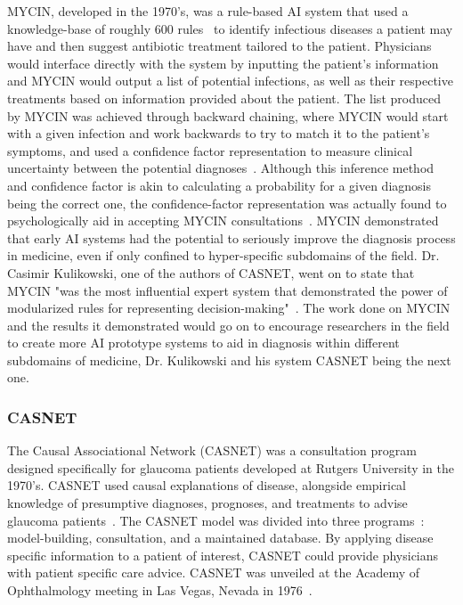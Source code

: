 \documentclass{article}
\begin{document}
MYCIN, developed in the 1970's, was a rule-based AI system that used a knowledge-base of roughly 600 rules~\cite{kaul_history_2020} to identify infectious diseases a patient may have and then suggest antibiotic treatment tailored to the patient. Physicians would interface directly with the system by inputting the patient's information and MYCIN would output a list of potential infections, as well as their respective treatments based on information provided about the patient. The list produced by MYCIN was achieved through backward chaining, where MYCIN would start with a given infection and work backwards to try to match it to the patient's symptoms, and used a confidence factor representation to measure clinical uncertainty between the potential diagnoses~\cite{kulikowski_beginnings_2019}. Although this inference method and confidence factor is akin to calculating a probability for a given diagnosis being the correct one, the confidence-factor representation was actually found to psychologically aid in accepting MYCIN consultations~\cite{kulikowski_beginnings_2019}. MYCIN demonstrated that early AI systems had the potential to seriously improve the diagnosis process in medicine, even if only confined to hyper-specific subdomains of the field. Dr. Casimir Kulikowski, one of the authors of CASNET, went on to state that MYCIN "was the most influential expert system that demonstrated the power of modularized rules for representing decision-making"~\cite{kulikowski_beginnings_2019}. The work done on MYCIN and the results it demonstrated would go on to encourage researchers in the field to create more AI prototype systems to aid in diagnosis within different subdomains of medicine, Dr. Kulikowski and his system CASNET being the next one.

\subsubsection{CASNET}

The Causal Associational Network (CASNET) was a consultation program designed specifically for glaucoma patients developed at Rutgers University in the 1970's. CASNET used causal explanations of disease, alongside empirical knowledge of presumptive diagnoses, prognoses, and treatments to advise glaucoma patients~\cite{kulikowski_beginnings_2019}. The CASNET model was divided into three programs~\cite{kaul_history_2020}: model-building, consultation, and a maintained database. By applying disease specific information to a patient of interest, CASNET could provide physicians with patient specific care advice. CASNET was unveiled at the Academy of Ophthalmology meeting in Las Vegas, Nevada in 1976~\cite{kaul_history_2020}.
\end{document}
